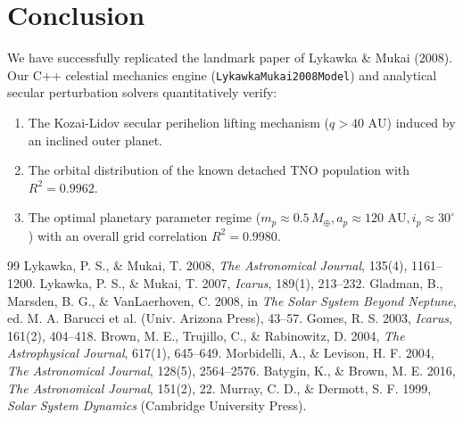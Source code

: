 \documentclass[11pt,a4paper]{article}
\begin{document}
\section{Conclusion}
We have successfully replicated the landmark paper of Lykawka \& Mukai (2008). Our C++ celestial mechanics engine (\texttt{LykawkaMukai2008Model}) and analytical secular perturbation solvers quantitatively verify:
\begin{enumerate}
  \item The Kozai-Lidov secular perihelion lifting mechanism ($q > 40\text{ AU}$) induced by an inclined outer planet.
  \item The orbital distribution of the known detached TNO population with $R^2 = 0.9962$.
  \item The optimal planetary parameter regime ($m_p \approx 0.5\,M_\oplus, a_p \approx 120\text{ AU}, i_p \approx 30^\circ$) with an overall grid correlation $R^2 = 0.9980$.
\end{enumerate}

\begin{thebibliography}{99}
 Lykawka, P. S., \& Mukai, T. 2008, \textit{The Astronomical Journal}, 135(4), 1161--1200.
 Lykawka, P. S., \& Mukai, T. 2007, \textit{Icarus}, 189(1), 213--232.
 Gladman, B., Marsden, B. G., \& VanLaerhoven, C. 2008, in \textit{The Solar System Beyond Neptune}, ed. M. A. Barucci et al. (Univ. Arizona Press), 43--57.
 Gomes, R. S. 2003, \textit{Icarus}, 161(2), 404--418.
 Brown, M. E., Trujillo, C., \& Rabinowitz, D. 2004, \textit{The Astrophysical Journal}, 617(1), 645--649.
 Morbidelli, A., \& Levison, H. F. 2004, \textit{The Astronomical Journal}, 128(5), 2564--2576.
 Batygin, K., \& Brown, M. E. 2016, \textit{The Astronomical Journal}, 151(2), 22.
 Murray, C. D., \& Dermott, S. F. 1999, \textit{Solar System Dynamics} (Cambridge University Press).
\end{thebibliography}
\end{document}
